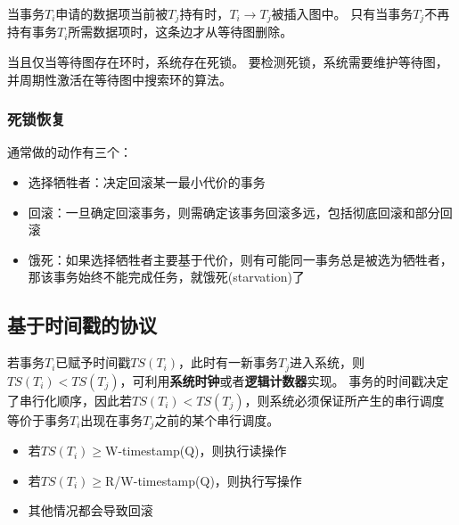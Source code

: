 当事务$T_i$申请的数据项当前被$T_j$持有时，$T_i\to T_j$被插入图中。
只有当事务$T_j$不再持有事务$T_i$所需数据项时，这条边才从等待图删除。

当且仅当等待图存在环时，系统存在死锁。
要检测死锁，系统需要维护等待图，并周期性激活在等待图中搜索环的算法。

\subsubsection{死锁恢复}
通常做的动作有三个：
\begin{itemize}
	\item 选择牺牲者：决定回滚某一最小代价的事务
	\item 回滚：一旦确定回滚事务，则需确定该事务回滚多远，包括彻底回滚和部分回滚
	\item 饿死：如果选择牺牲者主要基于代价，则有可能同一事务总是被选为牺牲者，那该事务始终不能完成任务，就饿死(starvation)了
\end{itemize}

\subsection{基于时间戳的协议}
若事务$T_i$已赋予时间戳$TS(T_i)$，此时有一新事务$T_j$进入系统，则$TS(T_i)<TS(T_j)$，可利用\textbf{系统时钟}或者\textbf{逻辑计数器}实现。
事务的时间戳决定了串行化顺序，因此若$TS(T_i)<TS(T_j)$，则系统必须保证所产生的串行调度等价于事务$T_i$出现在事务$T_j$之前的某个串行调度。

\begin{itemize}
	\item 若$TS(T_i)\geq$W-timestamp(Q)，则执行读操作
	\item 若$TS(T_i)\geq$R/W-timestamp(Q)，则执行写操作
	\item 其他情况都会导致回滚
\end{itemize}